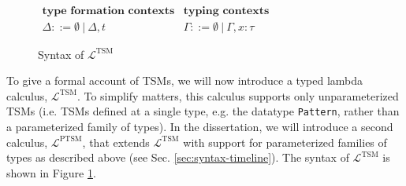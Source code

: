 \begin{figure}
~\\
$\begin{array}{ll}
\textbf{type formation contexts} & \textbf{typing contexts}\\
\Delta ::= \emptyset ~\vert~ \Delta, t & \Gamma ::= \emptyset ~\vert~ \Gamma, x : \tau
\end{array}$
\caption{Syntax of $\mathcal{L}^\text{TSM}$}
\label{fig:lambda-tsm-syntax}
\end{figure}
To give a formal account of TSMs, we will now introduce a typed lambda calculus, $\mathcal{L}^\text{TSM}$. To simplify matters, this calculus supports only unparameterized TSMs (i.e. TSMs defined at a single type, e.g. the datatype \lstinline{Pattern}, rather than a parameterized family of types). In the dissertation, we will introduce a second calculus, $\mathcal{L}^\text{PTSM}$, that extends $\mathcal{L}^\text{TSM}$ with support for parameterized families of types as described above (see Sec. \ref{sec:syntax-timeline}). The syntax of $\mathcal{L}^\text{TSM}$ is shown in Figure \ref{fig:lambda-tsm-syntax}.

